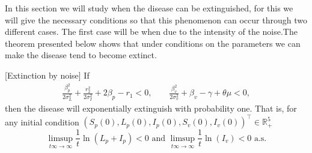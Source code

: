 
	In this section we will study when the disease can be extinguished, for 
this we will give the necessary conditions so that this phenomenon can occur 
through two different cases. The first case will be when due to the intensity 
of the noise.The theorem presented below shows that under conditions on the parameters we can make the disease tend to become extinct.
\begin{theorem}\label{theorem_noise}[Extinction by noise]
	If
	\begin{align*}
		\frac{\beta_p ^ 2}{2\sigma_L ^ 2} + 
		\frac{r_2^2}{2\sigma_I^2} + 
		2 \beta_p - r_1 < 0,
		\qquad
		\frac{\beta_v^2}{2\sigma_v^2} + 
		\beta_v - \gamma + \theta \mu < 0,
	\end{align*}		
	 then the disease will exponentially extinguish with probability one. That 
	 is, for any initial condition 
	 $(S_p(0), L_p(0), I_p(0), S_v(0), I_v(0)) ^ \top \in \mathbb{R}_+^5$
	\begin{equation*}
		\limsup_{t\infty \to \infty}
		\frac{1}{t}
		\ln(L_p + I_p) < 0 \text{ and }
		\limsup_{t\infty \to \infty}
		\frac{1}{t}\ln(I_v)< 0\,\,\mbox{a.s.}
	\end{equation*}
\end{theorem}
